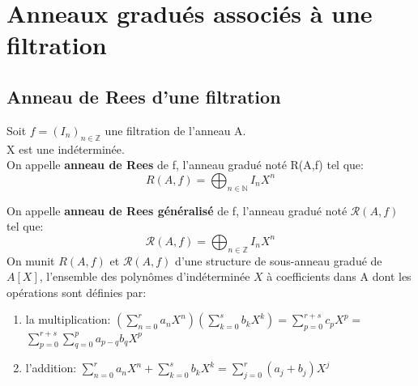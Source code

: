 \section{Anneaux gradués associés à une filtration}
\subsection{Anneau de Rees d'une filtration}
\begin{madefinition}
	Soit $f=(I_n)_{n \in \mathbb{Z}}$ une filtration de l'anneau A.\\ X est une indéterminée.\\
	On appelle \textbf{anneau de Rees} de f, l'anneau gradué noté R(A,f) tel que: 
	\[ R(A,f)  =\displaystyle \bigoplus_{n \in \mathbb{N}}{I_n X^n}  \]
	
	On appelle \textbf{anneau de Rees généralisé} de f, l'anneau gradué noté $\mathcal{R}(A,f)$ tel que: 
	\[ \mathcal{R}(A,f) = \displaystyle \bigoplus_{n \in \mathbb{Z}}{I_n X^n}  \]
	On munit $R(A,f)$ et $\mathcal{R}(A,f)$ d'une structure de sous-anneau gradué de $A[X]$, l'ensemble des polynômes d'indéterminée $X$ à coefficients dans A dont les opérations sont définies par:
	
	\begin{enumerate}
		\item la multiplication:	$(\sum\limits_{n=0}^{r}a_{n}X^{n})(\sum\limits_{k=0}^{s}b_{k}X^{k})=\sum%
		\limits_{p=0}^{r+s}c_{p}X^{p}=$ $\sum\limits_{p=0}^{r+s}\sum%
		\limits_{q=0}^{p}a_{p-q}b_{q}X^{p}$
		\item l'addition:   $\sum\limits_{n=0}^{r}a_{n}X^{n}+\sum\limits_{k=0}^{s}b_{k}X^{k}=\sum%
		\limits_{j=0}^{r}(a_{j}+b_{j})X^{j}$
	\end{enumerate}
\end{madefinition}
